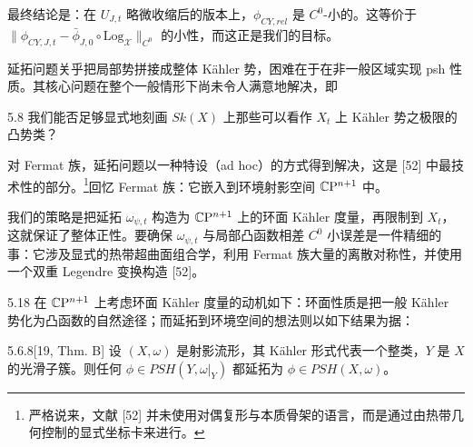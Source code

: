 最终结论是：在 $U_{J,t}$ 略微收缩后的版本上，$\phi_{CY,rel}$ 是 $C^0$-小的。这等价于 $\|\phi_{CY,J,t}-\bar\phi_{J,0}\circ\mathrm{Log}_{\mathcal X}\|_{C^0}$ 的小性，而这正是我们的目标。


延拓问题关乎把局部势拼接成整体 Kähler 势，困难在于在非一般区域实现 psh 性质。其核心问题在整个一般情形下尚未令人满意地解决，即

\begin{question}{5.8}
我们能否足够显式地刻画 $Sk(X)$ 上那些可以看作 $X_t$ 上 Kähler 势之极限的凸势类？
\end{question}


对 Fermat 族，延拓问题以一种特设（ad hoc）的方式得到解决，这是 [52] 中最技术性的部分。\footnote{严格说来，文献 [52] 并未使用对偶复形与本质骨架的语言，而是通过由热带几何控制的显式坐标卡来进行。}回忆 Fermat 族：它嵌入到环境射影空间 $\mathbb{C}\mathrm{P}^{n+1}$ 中。

我们的策略是把延拓 $\omega_{\psi,t}$ 构造为 $\mathbb{C}\mathrm{P}^{n+1}$ 上的环面 Kähler 度量，再限制到 $X_t$，这就保证了整体正性。要确保 $\omega_{\psi,t}$ 与局部凸函数相差 $C^0$ 小误差是一件精细的事：它涉及显式的热带超曲面组合学，利用 Fermat 族大量的离散对称性，并使用一个双重 Legendre 变换构造 [52]。


\begin{remark}{5.18}
在 $\mathbb{C}\mathrm{P}^{n+1}$ 上考虑环面 Kähler 度量的动机如下：环面性质是把一般 Kähler 势化为凸函数的自然途径；而延拓到环境空间的想法则以如下结果为据：
\end{remark}

\begin{proposition}{5.6.8}[19, Thm. B]
设 $(X,\omega)$ 是射影流形，其 Kähler 形式代表一个整类，$Y$ 是 $X$ 的光滑子簇。则任何 $\phi\in PSH(Y,\omega|_Y)$ 都延拓为 $\phi\in PSH(X,\omega)$。
\end{proposition}

